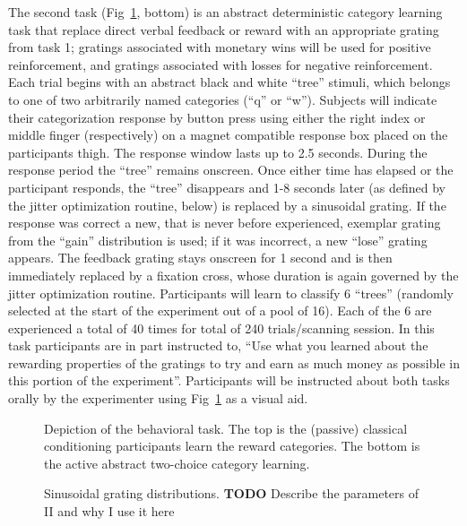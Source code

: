 \documentclass[doc,12pt]{apa}        %
\begin{document}
The second task (Fig~\ref{fig:task}, bottom) is an abstract deterministic category learning task that replace direct verbal feedback or reward with an appropriate grating from task 1; gratings associated with monetary wins will be used for positive reinforcement, and gratings associated with losses for negative reinforcement.   Each trial begins with an abstract black and white ``tree'' stimuli, which belongs to one of two arbitrarily named categories (``q'' or ``w'').  Subjects will indicate their categorization response by button press using either the right index or middle finger (respectively) on a magnet compatible response box placed on the participants thigh.  The response window lasts up to 2.5 seconds.  During the response period the ``tree'' remains onscreen.  Once either time has elapsed or the participant responds, the ``tree'' disappears and 1-8 seconds later (as defined by the jitter optimization routine, below) is replaced by a sinusoidal grating.  If the response was correct a new, that is never before experienced, exemplar grating from the ``gain'' distribution is used; if it was incorrect, a new ``lose'' grating appears.  The feedback grating stays onscreen for 1 second and is then immediately replaced by a fixation cross, whose duration is again governed by the jitter optimization routine.  Participants will learn to classify 6 ``trees'' (randomly selected at the start of the experiment out of a pool of 16). Each of the 6 are experienced a total of 40 times for total of 240 trials/scanning session. In this task participants are in part instructed to, ``Use what you learned about the rewarding properties of the gratings to try and earn as much money as possible in this portion of the experiment''.  Participants will be instructed about both tasks orally by the experimenter using Fig~\ref{fig:task} as a visual aid.

\begin{figure}[tp]
	\label{fig:task}
	\caption{Depiction of the behavioral task. The top is the (passive) classical conditioning participants learn the reward categories.  The bottom is the active abstract two-choice category learning.}
\end{figure}

\begin{figure}[tp]
	\label{fig:II}
	\caption{Sinusoidal grating distributions. \textbf{TODO} Describe the parameters of II and why I use it here}
\end{figure}
\end{document}

